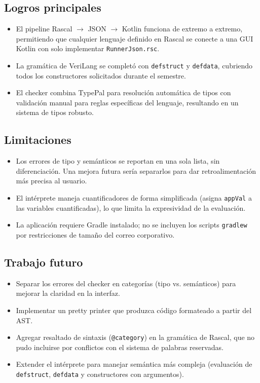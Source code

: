 \documentclass[12pt]{article}
\newcommand{\code}[1]{\texttt{#1}}
\begin{document}
\subsection*{Logros principales}
\begin{itemize}
  \item El pipeline Rascal $\rightarrow$ JSON $\rightarrow$ Kotlin funciona
        de extremo a extremo, permitiendo que cualquier lenguaje definido
        en Rascal se conecte a una GUI Kotlin con solo implementar
        \code{RunnerJson.rsc}.
  \item La gramática de VeriLang se completó con \code{defstruct} y
        \code{defdata}, cubriendo todos los constructores solicitados
        durante el semestre.
  \item El checker combina TypePal para resolución automática de tipos
        con validación manual para reglas específicas del lenguaje,
        resultando en un sistema de tipos robusto.
\end{itemize}

\subsection*{Limitaciones}
\begin{itemize}
  \item Los errores de tipo y semánticos se reportan en una sola lista,
        sin diferenciación. Una mejora futura sería separarlos para
        dar retroalimentación más precisa al usuario.
  \item El intérprete maneja cuantificadores de forma simplificada
        (asigna \code{appVal} a las variables cuantificadas), lo que
        limita la expresividad de la evaluación.
  \item La aplicación requiere Gradle instalado; no se incluyen los
        scripts \code{gradlew} por restricciones de tamaño del correo
        corporativo.
\end{itemize}

\subsection*{Trabajo futuro}
\begin{itemize}
  \item Separar los errores del checker en categorías (tipo vs. semánticos)
        para mejorar la claridad en la interfaz.
  \item Implementar un pretty printer que produzca código formateado
        a partir del AST.
  \item Agregar resaltado de sintaxis (\code{@category}) en la gramática
        de Rascal, que no pudo incluirse por conflictos con el sistema
        de palabras reservadas.
  \item Extender el intérprete para manejar semántica más compleja
        (evaluación de \code{defstruct}, \code{defdata} y constructores
        con argumentos).
\end{itemize}
\end{document}
